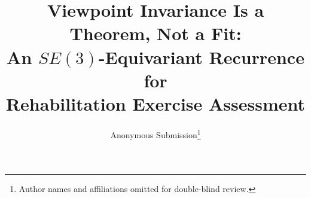 \documentclass[10pt,journal]{IEEEtran}
\begin{document}
\title{Viewpoint Invariance Is a Theorem, Not a Fit:\\%
An $SE(3)$-Equivariant Recurrence for\\%
Rehabilitation Exercise Assessment}

\author{Anonymous Submission\thanks{Author names and affiliations omitted for double-blind review.}}

\maketitle
\end{document}
